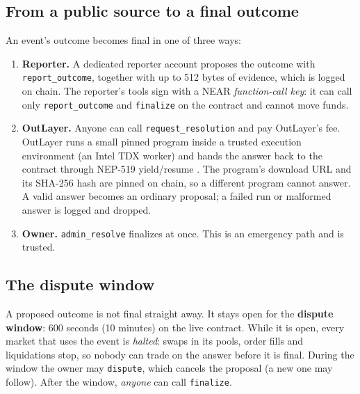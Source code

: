 \documentclass[11pt,a4paper]{article}
\newcommand{\code}[1]{\texttt{\small #1}}
\begin{document}
\subsection{From a public source to a final outcome}

An event's outcome becomes final in one of three ways:
\begin{enumerate}
\item \textbf{Reporter.} A dedicated reporter account proposes the outcome with \code{report\_outcome}, together with
up to 512 bytes of evidence, which is logged on chain. The reporter's tools sign with a NEAR \emph{function-call key}:
it can call only \code{report\_outcome} and \code{finalize} on the contract and cannot move funds.
\item \textbf{OutLayer.} Anyone can call \code{request\_resolution} and pay OutLayer's fee. OutLayer \cite{outlayer}
runs a small pinned program inside a trusted execution environment (an Intel TDX worker) and hands the answer back to
the contract through NEP-519 yield/resume \cite{nep519}. The program's download URL and its SHA-256 hash are pinned on
chain, so a different program cannot answer. A valid answer becomes an ordinary proposal; a failed run or malformed
answer is logged and dropped.
\item \textbf{Owner.} \code{admin\_resolve} finalizes at once. This is an emergency path and is trusted.
\end{enumerate}

\subsection{The dispute window}

A proposed outcome is not final straight away. It stays open for the \textbf{dispute window}: 600 seconds (10
minutes) on the live contract. While it is open, every market that uses the event is \emph{halted}: swaps in its
pools, order fills and liquidations stop, so nobody can trade on the answer before it is final. During the window
the owner may \code{dispute}, which cancels the proposal (a new one may follow). After the window, \emph{anyone} can
call \code{finalize}.
\end{document}
